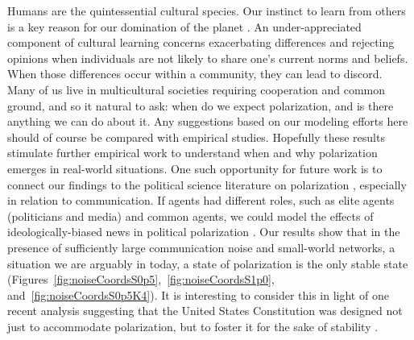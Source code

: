 Humans are the quintessential cultural species. Our instinct to learn from others is a key reason for our domination of the planet \cite{henrich2015secret,laland2017darwin}. An under-appreciated component of cultural learning concerns exacerbating differences and rejecting opinions when individuals are not likely to share one's current norms and beliefs. When those differences occur within a community, they can lead to discord. Many of us live in multicultural societies requiring cooperation and common ground, and so it natural to ask: when do we expect polarization, and is there anything we can do about it. Any suggestions based on our modeling efforts here should of course be compared with empirical studies. Hopefully these results stimulate further 
empirical work to understand when and why polarization emerges in
real-world situations. One such opportunity for future work is to connect our findings to 
the political science literature on polarization \cite{Sides2015}, 
especially in relation to communication. 
If agents had different roles, such as elite agents (politicians and media) and common agents, 
we could model the effects of ideologically-biased news in political polarization \cite{Prior2013,Pew2014}. 
Our results show that in the presence of sufficiently large communication noise and 
small-world networks, a situation we are arguably in today, a state of polarization 
is the only stable state (Figures~\ref{fig:noiseCoordsS0p5},~\ref{fig:noiseCoordsS1p0}, and~\ref{fig:noiseCoordsS0p5K4}). 
It is interesting to consider this in light of one recent analysis suggesting that the United States Constitution was designed not just to accommodate polarization, but to foster it for the sake of stability 
\cite{Wood2017b}. 

